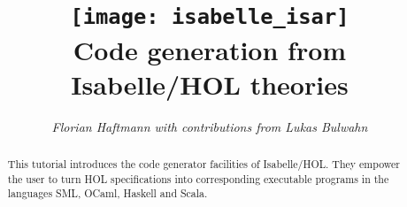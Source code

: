 \documentclass[12pt,a4paper,fleqn]{article}
\title{\texttt{[image: isabelle\_isar]}
  \\[4ex] Code generation from Isabelle/HOL theories}
\author{\emph{Florian Haftmann with contributions from Lukas Bulwahn}}
\begin{document}
\maketitle

\begin{abstract}
  \noindent This tutorial introduces the code generator facilities of Isabelle/HOL.
    They empower the user to turn HOL specifications into corresponding executable
    programs in the languages SML, OCaml, Haskell and Scala.
\end{abstract}

\thispagestyle{empty}\clearpage

\clearfirst









\begingroup
 \small\raggedright\frenchspacing

\endgroup
\end{document}
